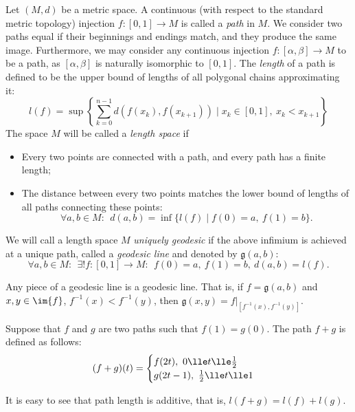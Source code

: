 \documentclass[12pt, a4paper]{article}
\newcommand{\g}{\mathfrak{g}}
\begin{document}
\begin{definition}\label{def-unigeo}
    Let \((M, d)\) be a metric space. A continuous (with respect to the standard metric topology) injection \(f \colon [0, 1] \to M\) is called a \textit{path} in \(M\). We consider two paths equal if their beginnings and endings match, and they produce the same image. Furthermore, we may consider any continuous injection \(f \colon [\alpha, \beta] \to M\) to be a path, as \([\alpha, \beta]\) is naturally isomorphic to \([0,1]\). The \textit{length} of a path is defined to be the upper bound of lengths of all polygonal chains approximating it: \[l(f) = \sup \left\{\sum_{k = 0}^{n-1} d(f(x_k), f(x_{k+1})) \mid x_k \in [0,1], \ x_k < x_{k+1}\right\}\] The space \(M\) will be called a \textit{length space} if

    \begin{itemize}
        \item[(1)] Every two points are connected with a path, and every path has a finite length;
        \item[(2)] The distance between every two points matches the lower bound of lengths of all paths connecting these points: \[\forall a, b \in M: \ \ d(a, b) = \inf \{l(f) \mid f(0) = a, \ f(1) = b\}.\]
    \end{itemize}

    We will call a length space \(M\) \textit{uniquely geodesic} if the above infimium is achieved at a unique path, called a \textit{geodesic line} and denoted by \(\g(a, b)\): \[\forall a, b \in M: \ \ \exists ! f \colon [0,1] \to M: \ \ f(0) = a, \ f(1) = b, \ d(a, b) = l(f).\]
\end{definition}

\begin{remark}\label{subgeodesic}
    Any piece of a geodesic line is a geodesic line. That is, if \(f = \g(a,b)\) and \(x, y \in \im{f}\), \(f^{-1}(x) < f^{-1}(y)\), then \(\g(x, y) = f|_{[f^{-1}(x), f^{-1}(y)]}\).
\end{remark}

\begin{remark}
    Suppose that \(f\) and \(g\) are two paths such that \(f(1) = g(0)\). The path \(f+g\) is defined as follows: \[(f+g)(t) = \begin{cases}
        f(2t), \ 0 \lle t \lle \frac{1}{2} \\
        g(2t-1), \ \frac{1}{2} \lle t \lle 1
    \end{cases}\]

    \vspace{1.5mm}

    It is easy to see that path length is additive, that is, \(l(f+g) = l(f) + l(g)\).
\end{remark}
\end{document}
